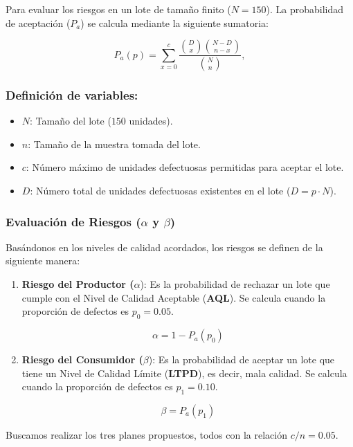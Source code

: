 \documentclass[
  12pt,
]{article}
\begin{document}
Para evaluar los riesgos en un lote de tamaño finito (\(N=150\)). La
probabilidad de aceptación (\(P_a\)) se calcula mediante la siguiente
sumatoria:

\[
P_a(p) = \sum_{x=0}^{c} \frac{\binom{D}{x} \binom{N-D}{n-x}}{\binom{N}{n}},
\]

\subsubsection{Definición de
variables:}\label{definiciuxf3n-de-variables}

\begin{itemize}
\item
  \(N\): Tamaño del lote (\(150\) unidades).
\item
  \(n\): Tamaño de la muestra tomada del lote.
\item
  \(c\): Número máximo de unidades defectuosas permitidas para aceptar
  el lote.
\item
  \(D\): Número total de unidades defectuosas existentes en el lote
  (\(D = p \cdot N\)).
\end{itemize}

\subsubsection{\texorpdfstring{Evaluación de Riesgos (\(\alpha\) y
\(\beta\))}{Evaluación de Riesgos (\textbackslash alpha y \textbackslash beta)}}\label{evaluaciuxf3n-de-riesgos-alpha-y-beta}

Basándonos en los niveles de calidad acordados, los riesgos se definen
de la siguiente manera:

\begin{enumerate}
\def\labelenumi{\arabic{enumi}.}
\item
  \textbf{Riesgo del Productor (}\(\alpha\)): Es la probabilidad de
  rechazar un lote que cumple con el Nivel de Calidad Aceptable
  (\textbf{AQL}). Se calcula cuando la proporción de defectos es
  \(p_0 = 0.05\).

  \[\alpha = 1 - P_a(p_0)\]
\item
  \textbf{Riesgo del Consumidor (}\(\beta\)): Es la probabilidad de
  aceptar un lote que tiene un Nivel de Calidad Límite (\textbf{LTPD}),
  es decir, mala calidad. Se calcula cuando la proporción de defectos es
  \(p_1 = 0.10\).

  \[\beta = P_a(p_1)\]
\end{enumerate}

Buscamos realizar los tres planes propuestos, todos con la relación
\(c/n = 0.05\).
\end{document}
